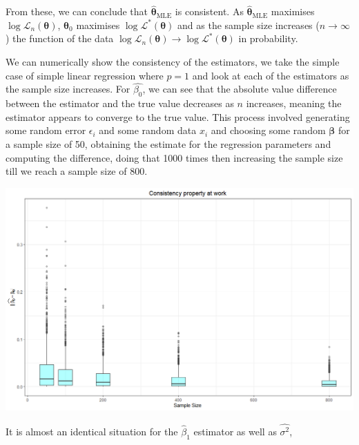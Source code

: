 \documentclass[honours,12pt]{unswthesis}
\newcommand{\mle}{\hat{\bm{\theta}}_{\text{MLE}}}
\numberwithin{equation}{section}
\begin{document}
From these, we can conclude that $\mle$ is consistent. As $\mle$ maximises $\log{\mathcal{L}_{n}(\bm{\theta})}$, $\bm{\theta}_{0}$ maximises $\log{\mathcal{L}^{*}(\bm{\theta})}$ and as the sample size increases ($n \rightarrow \infty$) the function of the data $\log{\mathcal{L}_{n}(\bm{\theta})} \rightarrow \log{\mathcal{L}^{*}(\bm{\theta})}$ in probability. \par
\noindent We can numerically show the consistency of the estimators, we take the simple case of simple linear regression where $p = 1$ and look at each of the estimators as the sample size increases. For $\hat{\beta_{0}}$, we can see that the absolute value difference between the estimator and the true value decreases as $n$ increases, meaning the estimator appears to converge to the true value. This process involved generating some random error $\epsilon_{i}$ and some random data $x_{i}$ and choosing some random $\bm{\beta}$ for a sample size of 50, obtaining the estimate for the regression parameters and computing the difference, doing that 1000 times then increasing the sample size till we reach a sample size of 800.

\begin{center}
	\includegraphics[width = \textwidth]{graphics/samp800n1000b0_box.png}

\end{center}

\noindent It is almost an identical situation for the $\hat{\beta}_{1}$ estimator as well as $\widehat{\sigma^{2}}$,
\end{document}
